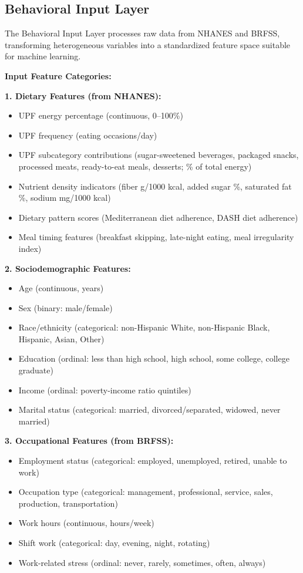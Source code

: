 \documentclass[journal,twoside,10pt]{IEEEtran}
\begin{document}
\subsection{Behavioral Input Layer}

The Behavioral Input Layer processes raw data from NHANES and BRFSS, transforming heterogeneous variables into a standardized feature space suitable for machine learning.

\textbf{Input Feature Categories:}

\textbf{1. Dietary Features (from NHANES):}
\begin{itemize}
\item UPF energy percentage (continuous, 0--100\%)
\item UPF frequency (eating occasions/day)
\item UPF subcategory contributions (sugar-sweetened beverages, packaged snacks, processed meats, ready-to-eat meals, desserts; \% of total energy)
\item Nutrient density indicators (fiber g/1000 kcal, added sugar \%, saturated fat \%, sodium mg/1000 kcal)
\item Dietary pattern scores (Mediterranean diet adherence, DASH diet adherence)
\item Meal timing features (breakfast skipping, late-night eating, meal irregularity index)
\end{itemize}

\textbf{2. Sociodemographic Features:}
\begin{itemize}
\item Age (continuous, years)
\item Sex (binary: male/female)
\item Race/ethnicity (categorical: non-Hispanic White, non-Hispanic Black, Hispanic, Asian, Other)
\item Education (ordinal: less than high school, high school, some college, college graduate)
\item Income (ordinal: poverty-income ratio quintiles)
\item Marital status (categorical: married, divorced/separated, widowed, never married)
\end{itemize}

\textbf{3. Occupational Features (from BRFSS):}
\begin{itemize}
\item Employment status (categorical: employed, unemployed, retired, unable to work)
\item Occupation type (categorical: management, professional, service, sales, production, transportation)
\item Work hours (continuous, hours/week)
\item Shift work (categorical: day, evening, night, rotating)
\item Work-related stress (ordinal: never, rarely, sometimes, often, always)
\end{itemize}
\end{document}
